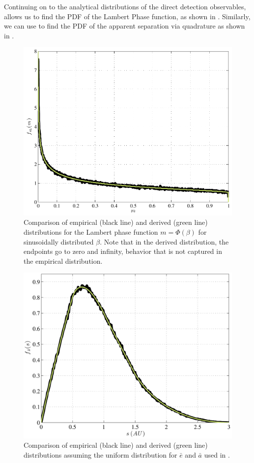 Continuing on to the analytical distributions of the direct detection observables,  allows us to find the PDF of the Lambert Phase function, as shown in .  Similarly, we can use  to find the PDF of the apparent separation via quadrature as shown in .
\begin{figure}[ht]
\centering
\includegraphics[width=5in]{./figures/mdist}
\caption[Validation of analytical $m$ PDF.]{ Comparison of empirical (black line) and derived (green line) distributions for the Lambert phase function $m = \Phi(\beta)$ for sinusoidally distributed $\beta$. Note that in the derived distribution, the endpoints go to zero and infinity, behavior that is not captured in the empirical distribution. \label{fig:mdist}}
\end{figure}  
\begin{figure}[ht]
\centering
\includegraphics[width=5in]{./figures/sint}
\caption[Validation of analytical $s$ PDF.]{ Comparison of empirical (black line) and derived (green line) distributions assuming the uniform distribution for $\bar e$ and $\bar a$ used in . \label{fig:sint}}
\end{figure}

